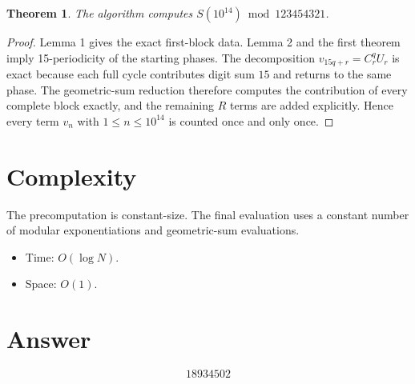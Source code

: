 \documentclass[11pt]{article}
\newtheorem{theorem}{Theorem}
\begin{document}
\begin{theorem}
The algorithm computes $S(10^{14}) \bmod 123454321$.
\end{theorem}

\begin{proof}
Lemma 1 gives the exact first-block data. Lemma 2 and the first theorem imply 15-periodicity of the starting phases. The decomposition $v_{15q+r}=C_r^q U_r$ is exact because each full cycle contributes digit sum $15$ and returns to the same phase. The geometric-sum reduction therefore computes the contribution of every complete block exactly, and the remaining $R$ terms are added explicitly. Hence every term $v_n$ with $1 \le n \le 10^{14}$ is counted once and only once.
\end{proof}

\section{Complexity}

The precomputation is constant-size. The final evaluation uses a constant number of modular exponentiations and geometric-sum evaluations.

\begin{itemize}
\item Time: $O(\log N)$.
\item Space: $O(1)$.
\end{itemize}

\section{Answer}

\[
\boxed{18934502}
\]
\end{document}
